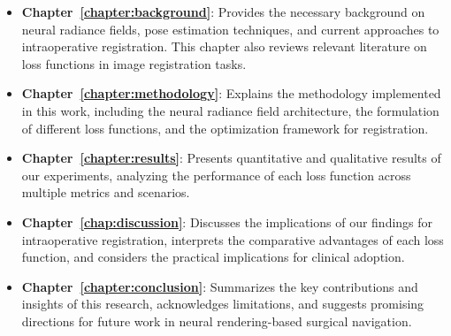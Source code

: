 \begin{itemize}
    \item \textbf{Chapter~\ref{chapter:background}}: Provides the necessary background on neural radiance fields, pose estimation techniques, and current approaches to intraoperative registration. This chapter also reviews relevant literature on loss functions in image registration tasks.
    
    \item \textbf{Chapter~\ref{chapter:methodology}}: Explains the methodology implemented in this work, including the neural radiance field architecture, the formulation of different loss functions, and the optimization framework for registration.
        
    \item \textbf{Chapter~\ref{chapter:results}}: Presents quantitative and qualitative results of our experiments, analyzing the performance of each loss function across multiple metrics and scenarios.
    
    \item \textbf{Chapter~\ref{chap:discussion}}: Discusses the implications of our findings for intraoperative registration, interprets the comparative advantages of each loss function, and considers the practical implications for clinical adoption.
    
    \item \textbf{Chapter~\ref{chapter:conclusion}}: Summarizes the key contributions and insights of this research, acknowledges limitations, and suggests promising directions for future work in neural rendering-based surgical navigation.
\end{itemize}
